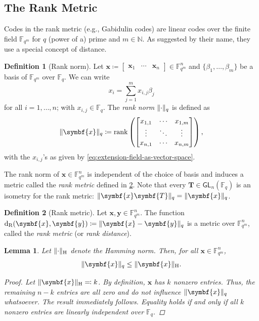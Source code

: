 \documentclass[version=last, paper=A4, parskip=half, oneside,%
toc=bibliography, toc=listof, listof=leveldown]{scrbook}
\theoremstyle{plain}
\newtheorem{lemma}{Lemma}
\theoremstyle{definition}
\newtheorem{definition}{Definition}
\theoremstyle{remark}
\renewcommand*{\vec}{\symbf}
\newcommand*{\mat}{\symbf}
\DeclareMathOperator{\rank}{rank}
\newcommand*{\GL}{\ensuremath{\mathsf{GL}}}
\newcommand*{\FF}{\ensuremath{\mathbb{F}}}
\newcommand*{\NN}{\ensuremath{\mathbb{N}}}
\DeclarePairedDelimiter{\norm}{\lVert}{\rVert}
\newcommand*{\normH}[1]{\ensuremath{\norm{#1}_{\mathrm{H}}}}
\newcommand*{\normR}[2]{\ensuremath{\norm{#1}_{#2}}}
\DeclareMathOperator{\dR}{d_R}
\begin{document}
\subsection{The Rank Metric}

Codes in the rank metric (e.g., Gabidulin codes) are linear codes over the
finite field \(\FF_{q^m}\) for \(q\) (power of a) prime and \(m \in \NN\).  As
suggested by their name, they use a special concept of distance.

\begin{definition}[Rank norm]
  Let
  \(\vec{x} \coloneqq \begin{bmatrix} \vec{x}_1 & \cdots & \vec{x}_n \end{bmatrix} \in \FF_{q^m}^n\)
  and \(\{\beta_1, \ldots, \beta_m\}\) be a basis of \(\FF_{q^m}\) over
  \(\FF_q\).  We can write
  \begin{equation}\label{eq:extension-field-as-vector-space}
    x_i = \sum_{j = 1}^m x_{i, j} \beta_j
  \end{equation}
  for all \(i = 1, \ldots, n\); with \(x_{i, j} \in \FF_q\).  The \emph{rank
    norm} \(\normR{\cdot}{q}\) is defined as
  \[
    \normR{\vec{x}}{q} \coloneqq
    \rank\left(
      \begin{bmatrix}
        x_{1, 1} & \cdots & x_{1, m} \\
        \vdots & \ddots & \vdots \\
        x_{n, 1} & \cdots & x_{n, m}
      \end{bmatrix}
    \right)\text,
  \]
  with the \(x_{i, j}\)'s as given by \cref{eq:extension-field-as-vector-space}.
\end{definition}

The rank norm of \(\vec{x} \in \FF_{q^m}^n\) is independent of the choice of
basis and induces a metric called the \emph{rank metric} defined in
\cref{def:rank-metric}.  Note that every \(\mat{T} \in \GL_n(\FF_q)\) is an
isometry for the rank metric:
\(\normR{\vec{x} \mat{T}}{q} = \normR{\vec{x}}{q}\).

\begin{definition}[Rank metric]\label{def:rank-metric}
  Let \(\vec{x}, \vec{y} \in \FF_{q^m}^n\).  The function
  \(\dR(\vec{x}, \vec{y}) \coloneqq \normR{\vec{x} - \vec{y}}{q}\) is a metric
  over \(\FF_{q^m}^n\), called the \emph{rank metric} (or \emph{rank distance}).
\end{definition}

\begin{lemma}
  Let \(\normH{\cdot}\) denote the Hamming norm.  Then, for all
  \(\vec{x} \in \FF_{q^m}^n\),
  \[
    \normR{\vec{x}}{q} \le \normH{\vec{x}}\text.
  \]
  \begin{proof}
    Let \(\normH{\vec{x}} \eqqcolon k\).  By definition, \(\vec{x}\) has \(k\)
    nonzero entries.  Thus, the remaining \(n - k\) entries are all zero and do
    not influence \(\normR{\vec{x}}{q}\) whatsoever.  The result immediately
    follows.  Equality holds if and only if all \(k\) nonzero entries are
    linearly independent over \(\FF_q\).
  \end{proof}
\end{lemma}
\end{document}
